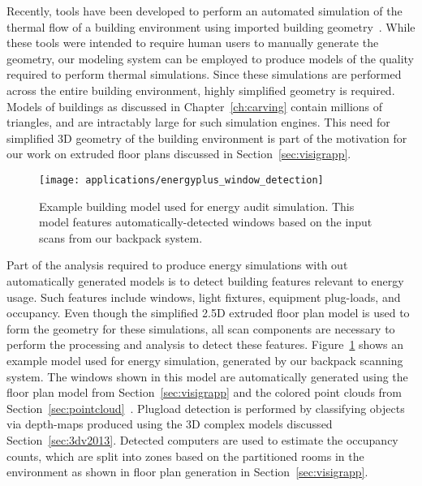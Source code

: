 \documentclass[12pt,onecolumn,oneside]{book}
\begin{document}
Recently, tools have been developed to perform an automated simulation of the thermal flow of a building environment using imported building geometry~\cite{EnergyPlus}.  While these tools were intended to require human users to manually generate the geometry, our modeling system can be employed to produce models of the quality required to perform thermal simulations.  Since these simulations are performed across the entire building environment, highly simplified geometry is required.  Models of buildings as discussed in Chapter~\ref{ch:carving} contain millions of triangles, and are intractably large for such simulation engines.  This need for simplified 3D geometry of the building environment is part of the motivation for our work on extruded floor plans discussed in Section~\ref{sec:visigrapp}.

\begin{figure}[t]

	\centerline{\texttt{[image: applications/energyplus\_window\_detection]}}
	
	\caption[Example building energy model with automatically-detected windows.]{Example building model used for energy audit simulation.  This model features automatically-detected windows based on the input scans from our backpack system.}
	\label{fig:windows}
\end{figure}

Part of the analysis required to produce energy simulations with out automatically generated models is to detect building features relevant to energy usage.  Such features include windows, light fixtures, equipment plug-loads, and occupancy.  Even though the simplified 2.5D extruded floor plan model is used to form the geometry for these simulations, all scan components are necessary to perform the processing and analysis to detect these features.  Figure~\ref{fig:windows} shows an example model used for energy simulation, generated by our backpack scanning system.  The windows shown in this model are automatically generated using the floor plan model from Section~\ref{sec:visigrapp} and the colored point clouds from Section~\ref{sec:pointcloud}~\cite{Zhang14}.  Plugload detection is performed by classifying objects via depth-maps produced using the 3D complex models discussed Section~\ref{sec:3dv2013}.  Detected computers are used to estimate the occupancy counts, which are split into zones based on the partitioned rooms in the environment as shown in floor plan generation in Section~\ref{sec:visigrapp}.
\end{document}
